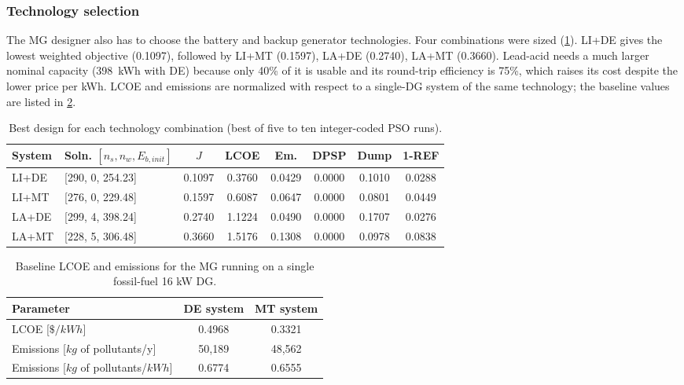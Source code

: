\documentclass[final,3p,times]{elsarticle}
\begin{document}
\subsubsection{Technology selection\label{sec:tech_select}}
The MG designer also has to choose the battery and backup generator technologies. Four combinations were sized (\cref{tab:tech_select}). LI+DE gives the lowest weighted objective (0.1097), followed by LI+MT (0.1597), LA+DE (0.2740), LA+MT (0.3660). Lead-acid needs a much larger nominal capacity (398~kWh with DE) because only 40\% of it is usable and its round-trip efficiency is 75\%, which raises its cost despite the lower price per kWh. LCOE and emissions are normalized with respect to a single-DG system of the same technology; the baseline values are listed in \cref{tab:baseline}.

\begin{table}[htbp]
\centering
\small
\begin{tabular}{l l c c c c c c}
\toprule
\textbf{System} & \textbf{Soln. $[n_s, n_w, E_{b,init}]$} & \textbf{$J$} & \textbf{LCOE} & \textbf{Em.} & \textbf{DPSP} & \textbf{Dump} & \textbf{1-REF} \\
\midrule
LI+DE & [290, 0, 254.23] & 0.1097 & 0.3760 & 0.0429 & 0.0000 & 0.1010 & 0.0288 \\
LI+MT & [276, 0, 229.48] & 0.1597 & 0.6087 & 0.0647 & 0.0000 & 0.0801 & 0.0449 \\
LA+DE & [299, 4, 398.24] & 0.2740 & 1.1224 & 0.0490 & 0.0000 & 0.1707 & 0.0276 \\
LA+MT & [228, 5, 306.48] & 0.3660 & 1.5176 & 0.1308 & 0.0000 & 0.0978 & 0.0838 \\
\bottomrule
\end{tabular}
\caption{\label{tab:tech_select} Best design for each technology combination (best of five to ten integer-coded PSO runs).}
\end{table}

\begin{table}[htbp]
\centering
\begin{tabular}{@{}lcc@{}}
\toprule
\textbf{Parameter} & DE system & MT system \\ 
\midrule
LCOE [$\$/kWh$] & 0.4968 & 0.3321 \\
Emissions [$kg$ of pollutants/y] & 50,189 & 48,562 \\
Emissions [$kg$ of pollutants/$kWh$] & 0.6774 & 0.6555 \\
\bottomrule
\end{tabular}
\caption{\label{tab:baseline} Baseline LCOE and emissions for the MG running on a single fossil-fuel 16 kW DG.}
\end{table}
\end{document}

